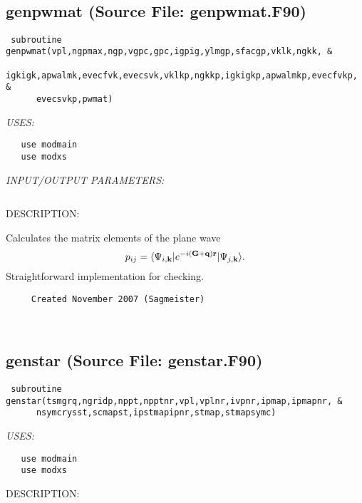 \documentclass[11pt]{article}
\begin{document}

 
 
\mbox{}\hrulefill\ 
 
\subsection{genpwmat (Source File: genpwmat.F90)}


\begin{verbatim} subroutine genpwmat(vpl,ngpmax,ngp,vgpc,gpc,igpig,ylmgp,sfacgp,vklk,ngkk, &
      igkigk,apwalmk,evecfvk,evecsvk,vklkp,ngkkp,igkigkp,apwalmkp,evecfvkp, &
      evecsvkp,pwmat)\end{verbatim}{\em USES:}
\begin{verbatim}   use modmain
   use modxs\end{verbatim}{\em INPUT/OUTPUT PARAMETERS:}
\begin{verbatim} \end{verbatim}
{\sf DESCRIPTION:\\ }

    Calculates the matrix elements of the plane wave
     $$ p_{ij}=\langle\Psi_{i,{\bf k}}|e^{-i({\bf G}+{\bf q}){\bf r}}|
        \Psi_{j,{\bf k}}\rangle. $$
    Straightforward implementation for checking.
  
\begin{verbatim}     Created November 2007 (Sagmeister)\end{verbatim}






 
 
\mbox{}\hrulefill\ 
 
\subsection{genstar (Source File: genstar.F90)}


\begin{verbatim} subroutine genstar(tsmgrq,ngridp,nppt,npptnr,vpl,vplnr,ivpnr,ipmap,ipmapnr, &
      nsymcrysst,scmapst,ipstmapipnr,stmap,stmapsymc)\end{verbatim}{\em USES:}
\begin{verbatim}   use modmain
   use modxs\end{verbatim}
{\sf DESCRIPTION:\\ }
\end{document}

